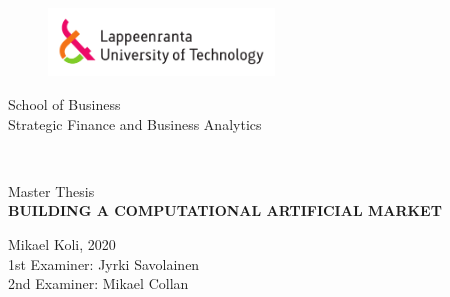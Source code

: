 
\thispagestyle{empty} \setlength{\parindent}{0pt}
\begin{figure}
\includegraphics[width=60mm]{./figs/Merkki_Logo_CMYK}\\
\end{figure}

\begin{flushleft}
    \vspace{60mm}
    School of Business\\
    Strategic Finance and Business Analytics
\end{flushleft}

~\\

\begin{center}
    \vspace{40mm}
    \Large
    \sffamily 
    Master Thesis\\
    \textbf{\MakeUppercase{Building a Computational Artificial Market}}\\

\end{center}

\vspace*{\fill}

\begin{flushright}
    \vspace{50mm}
    Mikael Koli, 2020\\
    1st Examiner: Jyrki Savolainen\\
    2nd Examiner: Mikael Collan
\end{flushright}